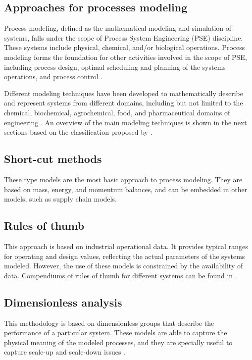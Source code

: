 \begin{refsection}[referencesCh1]
\section{Approaches for processes modeling}
Process modeling, defined as the mathematical modeling and simulation of systems, falls under the scope of Process System Engineering (PSE) discipline. These systems include physical, chemical, and/or biological operations. Process modeling forms the foundation for other activities involved in the scope of PSE, including process design, optimal scheduling and planning of the systems operations, and process control \citep{STEPHANOPOULOS20114272}.

Different modeling techniques have been developed to mathematically describe and represent systems from different domains, including but not limited to the chemical, biochemical, agrochemical, food, and pharmaceutical domains of engineering \citep{PISTIKOPOULOS2021107252}. An overview of the main modeling techniques is shown in the next sections based on the classification proposed by \citet{MARTIN201216}.

\subsection{Short-cut methods}
These type models are the most basic approach to process modeling. They are based on mass, energy, and momentum balances, and can be embedded in other models, such as supply chain models.

\subsection{Rules of thumb}
This approach is based on industrial operational data. It provides typical ranges for operating and design values, reflecting the actual parameters of the systems modeled. However, the use of these models is constrained by the availability of data. Compendiums of rules of thumb for different systems can be found in \citet{couper2005chemical, hall2012rules, sadhukhan2014biorefineries}.

\subsection{Dimensionless analysis}
This methodology is based on dimensionless groups that describe the performance of a particular system. These models are able to capture the physical meaning of the modeled processes, and they are specially useful to capture scale-up and scale-down issues \citep{szirtes2007applied}.


\end{refsection}
